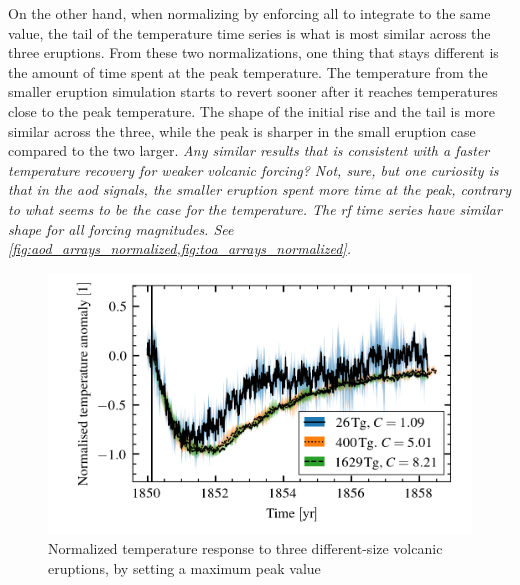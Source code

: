 \documentclass[twocol]{ametsocV5}
\begin{document}
On the other hand, when normalizing by enforcing all to integrate to the same value, the
tail of the temperature time series is what is most similar across the three eruptions.
From these two normalizations, one thing that stays different is the amount of time
spent at the peak temperature. The temperature from the smaller eruption simulation
starts to revert sooner after it reaches temperatures close to the peak temperature. The
shape of the initial rise and the tail is more similar across the three, while the peak
is sharper in the small eruption case compared to the two larger. \emph{ Any similar
  results that is consistent with a faster temperature recovery for weaker volcanic
  forcing? Not, sure, but one curiosity is that in the \acrshort{aod} signals, the smaller
  eruption spent more time at the peak, contrary to what seems to be the case for the
  temperature. The \acrshort{rf} time series have similar shape for all forcing
  magnitudes. See \cref{fig:aod_arrays_normalized,fig:toa_arrays_normalized}.}

\begin{figure}[t]
  \begin{center}
    \includegraphics[width=0.95\linewidth]{figures/compare-waveform-max.png}
  \end{center}
  \caption{Normalized temperature response to three different-size volcanic eruptions,
    by setting a maximum peak value}%
  \label{fig:temp_norm_max}
\end{figure}
\end{document}
